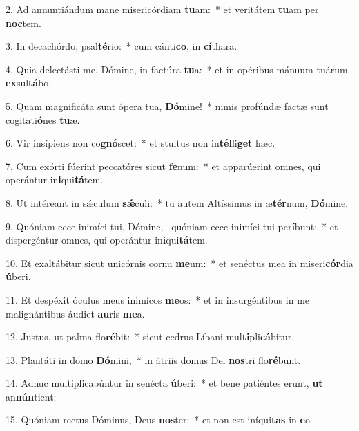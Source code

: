 2. Ad annuntiándum mane misericórdiam \textbf{tu}am:~*  et veritátem \textbf{tu}am per \textbf{noc}tem.\

3. In decachórdo, psal\textbf{té}rio:~*  cum cánti\textbf{co}, in \textbf{cí}thara.\

4. Quia delectásti me, Dómine, in factúra \textbf{tu}a:~*  et in opéribus mánuum tuárum \textbf{ex}sul\textbf{tá}bo.\

5. Quam magnificáta sunt ópera tua, \textbf{Dó}mine!~*  nimis profúndæ factæ sunt cogitati\textbf{ó}nes \textbf{tu}æ.\

6. Vir insípiens non co\textbf{gnó}scet:~*  et stultus non in\textbf{tél}li\textbf{get} hæc.\

7. Cum exórti fúerint peccatóres sicut \textbf{fe}num:~*  et apparúerint omnes, qui operántur in\textbf{i}qui\textbf{tá}tem.\

8. Ut intéreant in sǽculum \textbf{sǽ}culi:~*  tu autem Altíssimus in æ\textbf{tér}num, \textbf{Dó}mine.\

9. Quóniam ecce inimíci tui, Dómine, \dag\  quóniam ecce inimíci tui per\textbf{í}bunt:~*  et dispergéntur omnes, qui operántur in\textbf{i}qui\textbf{tá}tem.\

10. Et exaltábitur sicut unicórnis cornu \textbf{me}um:~*  et senéctus mea in miseri\textbf{cór}dia \textbf{ú}beri.\

11. Et despéxit óculus meus inimícos \textbf{me}os:~*  et in insurgéntibus in me malignántibus áudiet \textbf{au}ris \textbf{me}a.\

12. Justus, ut palma flo\textbf{ré}bit:~*  sicut cedrus Líbani mul\textbf{ti}pli\textbf{cá}bitur.\

13. Plantáti in domo \textbf{Dó}mini,~*  in átriis domus Dei \textbf{nos}tri flo\textbf{ré}bunt.\

14. Adhuc multiplicabúntur in senécta \textbf{ú}beri:~*  et bene patiéntes erunt, \textbf{ut} an\textbf{nún}tient:\

15. Quóniam rectus Dóminus, Deus \textbf{nos}ter:~*  et non est iníqui\textbf{tas} in \textbf{e}o.\

